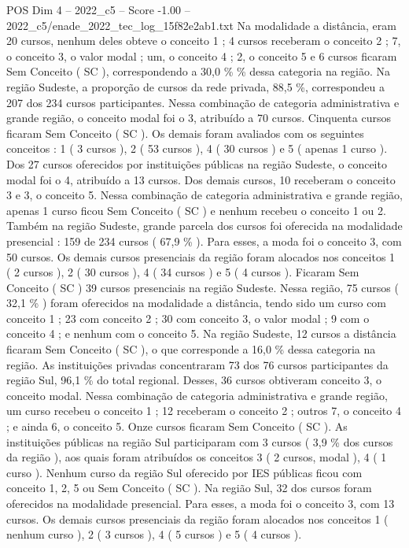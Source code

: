 \begin{textsample}{POS Dim 4 – 2022\_c5 – Score -1.00 – 2022\_c5/enade\_2022\_tec\_log\_15f82e2ab1.txt}
Na modalidade a distância, eram 20 cursos, nenhum deles obteve o conceito 1 ; 4 cursos receberam o conceito 2 ; 7, o conceito 3, o valor modal ; um, o conceito 4 ; 2, o conceito 5 e 6 cursos ficaram Sem Conceito ( SC ), correspondendo a 30,0 \% \% dessa categoria na região.
Na região Sudeste, a proporção de cursos da rede privada, 88,5 \%, correspondeu a 207 dos 234 cursos participantes.
Nessa combinação de categoria administrativa e grande região, o conceito modal foi o 3, atribuído a 70 cursos.
Cinquenta cursos ficaram Sem Conceito ( SC ).
Os demais foram avaliados com os seguintes conceitos : 1 ( 3 cursos ), 2 ( 53 cursos ), 4 ( 30 cursos ) e 5 ( apenas 1 curso ).
Dos 27 cursos oferecidos por instituições públicas na região Sudeste, o conceito modal foi o 4, atribuído a 13 cursos.
Dos demais cursos, 10 receberam o conceito 3 e 3, o conceito 5.
Nessa combinação de categoria administrativa e grande região, apenas 1 curso ficou Sem Conceito ( SC ) e nenhum recebeu o conceito 1 ou 2.
Também na região Sudeste, grande parcela dos cursos foi oferecida na modalidade presencial : 159 de 234 cursos ( 67,9 \% ).
Para esses, a moda foi o conceito 3, com 50 cursos.
Os demais cursos presenciais da região foram alocados nos conceitos 1 ( 2 cursos ), 2 ( 30 cursos ), 4 ( 34 cursos ) e 5 ( 4 cursos ).
Ficaram Sem Conceito ( SC ) 39 cursos presenciais na região Sudeste.
Nessa região, 75 cursos ( 32,1 \% ) foram oferecidos na modalidade a distância, tendo sido um curso com conceito 1 ; 23 com conceito 2 ; 30 com conceito 3, o valor modal ; 9 com o conceito 4 ; e nenhum com o conceito 5.
Na região Sudeste, 12 cursos a distância ficaram Sem Conceito ( SC ), o que corresponde a 16,0 \% dessa categoria na região.
As instituições privadas concentraram 73 dos 76 cursos participantes da região Sul, 96,1 \% do total regional.
Desses, 36 cursos obtiveram conceito 3, o conceito modal.
Nessa combinação de categoria administrativa e grande região, um curso recebeu o conceito 1 ; 12 receberam o conceito 2 ; outros 7, o conceito 4 ; e ainda 6, o conceito 5.
Onze cursos ficaram Sem Conceito ( SC ).
As instituições públicas na região Sul participaram com 3 cursos ( 3,9 \% dos cursos da região ), aos quais foram atribuídos os conceitos 3 ( 2 cursos, modal ), 4 ( 1 curso ).
Nenhum curso da região Sul oferecido por IES públicas ficou com conceito 1, 2, 5 ou Sem Conceito ( SC ).
Na região Sul, 32 dos cursos foram oferecidos na modalidade presencial.
Para esses, a moda foi o conceito 3, com 13 cursos.
Os demais cursos presenciais da região foram alocados nos conceitos 1 ( nenhum curso ), 2 ( 3 cursos ), 4 ( 5 cursos ) e 5 ( 4 cursos ).

\end{textsample}
